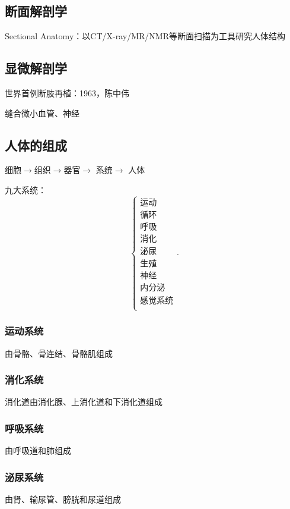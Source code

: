 \subsection*{断面解剖学}%
\label{sub:断面解剖学}
Sectional Anatomy：以CT/X-ray/MR/NMR等断面扫描为工具研究人体结构
\subsection*{显微解剖学}%
\label{sub:显微解剖学}
\begin{notation}
    世界首例断肢再植：1963，陈中伟
\end{notation}
缝合微小血管、神经

\subsection{人体的组成}%
\label{sub:人体的组成}
细胞$\to $组织$\to $器官$\to $ 系统$\to $ 人体

九大系统：
\[
    \begin{cases}
        \mbox{运动}\\
        \mbox{循环}\\
        \mbox{呼吸}\\
        \mbox{消化}\\
        \mbox{泌尿}\\
        \mbox{生殖}\\
        \mbox{神经}\\
        \mbox{内分泌}\\
        \mbox{感觉系统}\\
    \end{cases}
.\] 
\subsubsection*{运动系统}%
\label{subsub:运动系统}
由骨骼、骨连结、骨骼肌组成
\subsubsection*{消化系统}%
\label{subsub:消化系统}
消化道由消化腺、上消化道和下消化道组成
\subsubsection*{呼吸系统}%
\label{subsub:呼吸系统}
由呼吸道和肺组成
\subsubsection*{泌尿系统}%
\label{subsub:泌尿系统}
由肾、输尿管、膀胱和尿道组成
